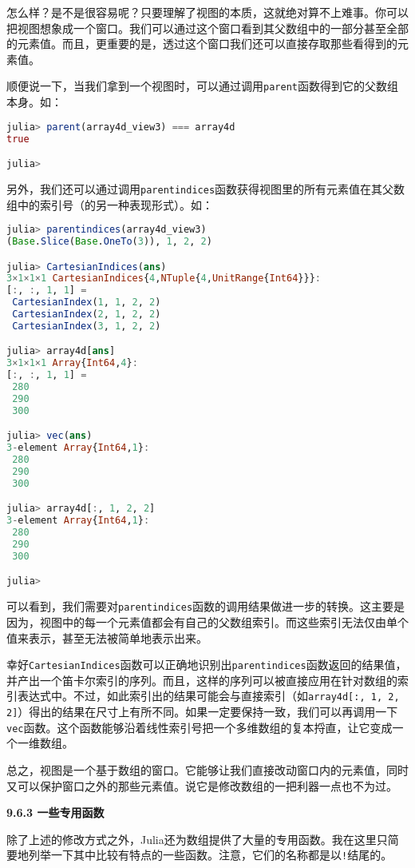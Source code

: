 怎么样？是不是很容易呢？只要理解了视图的本质，这就绝对算不上难事。你可以把视图想象成一个窗口。我们可以通过这个窗口看到其父数组中的一部分甚至全部的元素值。而且，更重要的是，透过这个窗口我们还可以直接存取那些看得到的元素值。

顺便说一下，当我们拿到一个视图时，可以通过调用\verb`parent`函数得到它的父数组本身。如：
\begin{lstlisting}[language=julia]
julia> parent(array4d_view3) === array4d
true

julia> 
\end{lstlisting}

另外，我们还可以通过调用\verb`parentindices`函数获得视图里的所有元素值在其父数组中的索引号（的另一种表现形式）。如：

\begin{lstlisting}[language=julia]
julia> parentindices(array4d_view3)
(Base.Slice(Base.OneTo(3)), 1, 2, 2)

julia> CartesianIndices(ans)
3×1×1×1 CartesianIndices{4,NTuple{4,UnitRange{Int64}}}:
[:, :, 1, 1] =
 CartesianIndex(1, 1, 2, 2)
 CartesianIndex(2, 1, 2, 2)
 CartesianIndex(3, 1, 2, 2)

julia> array4d[ans]
3×1×1×1 Array{Int64,4}:
[:, :, 1, 1] =
 280
 290
 300

julia> vec(ans)
3-element Array{Int64,1}:
 280
 290
 300

julia> array4d[:, 1, 2, 2]
3-element Array{Int64,1}:
 280
 290
 300

julia> 
\end{lstlisting}

可以看到，我们需要对\verb`parentindices`函数的调用结果做进一步的转换。这主要是因为，视图中的每一个元素值都会有自己的父数组索引。而这些索引无法仅由单个值来表示，甚至无法被简单地表示出来。

幸好\verb`CartesianIndices`函数可以正确地识别出\verb`parentindices`函数返回的结果值，并产出一个笛卡尔索引的序列。而且，这样的序列可以被直接应用在针对数组的索引表达式中。不过，如此索引出的结果可能会与直接索引（如\verb`array4d[:, 1, 2, 2]`）得出的结果在尺寸上有所不同。如果一定要保持一致，我们可以再调用一下\verb`vec`函数。这个函数能够沿着线性索引号把一个多维数组的复本捋直，让它变成一个一维数组。

总之，视图是一个基于数组的窗口。它能够让我们直接改动窗口内的元素值，同时又可以保护窗口之外的那些元素值。说它是修改数组的一把利器一点也不为过。

\textbf{9.6.3 一些专用函数}

除了上述的修改方式之外，Julia还为数组提供了大量的专用函数。我在这里只简要地列举一下其中比较有特点的一些函数。注意，它们的名称都是以\verb`!`结尾的。

